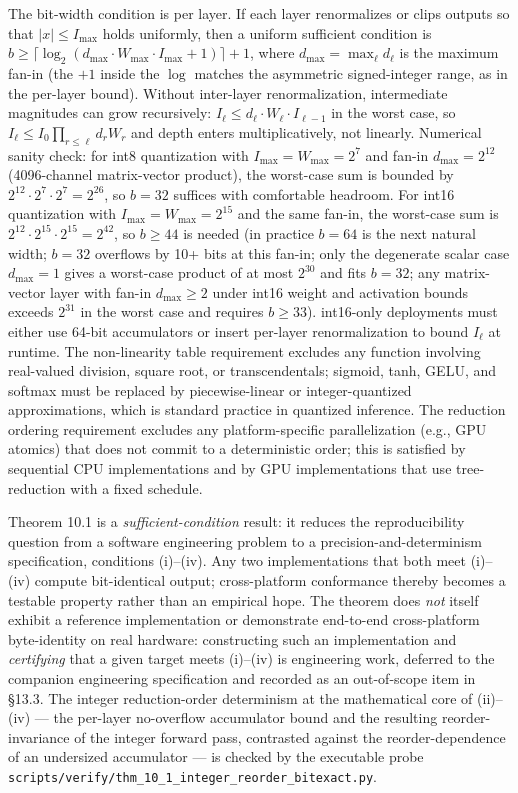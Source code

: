\documentclass[
]{article}
\begin{document}
The bit-width condition is per layer. If each layer renormalizes or
clips outputs so that $|x| \leq I_{\max}$ holds uniformly, then a
uniform sufficient condition is
$b \geq \lceil \log_2(d_{\max} \cdot W_{\max} \cdot I_{\max} + 1) \rceil + 1$,
where $d_{\max} = \max_\ell d_\ell$ is the maximum fan-in (the $+1$
inside the $\log$ matches the asymmetric signed-integer range, as in
the per-layer bound). Without inter-layer renormalization,
intermediate magnitudes can grow recursively:
$I_\ell \leq d_\ell \cdot W_\ell \cdot I_{\ell-1}$ in the worst
case, so $I_\ell \leq I_0 \prod_{r \leq \ell} d_r W_r$ and depth
enters multiplicatively, not linearly. Numerical sanity check: for
int8 quantization with $I_{\max} = W_{\max} = 2^7$ and fan-in
$d_{\max} = 2^{12}$ (4096-channel matrix-vector product), the
worst-case sum is bounded by $2^{12} \cdot 2^7 \cdot 2^7 = 2^{26}$,
so $b = 32$ suffices with comfortable headroom. For int16
quantization with $I_{\max} = W_{\max} = 2^{15}$ and the same
fan-in, the worst-case sum is $2^{12} \cdot 2^{15} \cdot 2^{15} =
2^{42}$, so $b \geq 44$ is needed (in practice $b = 64$ is the next
natural width; $b = 32$ overflows by 10+ bits at this fan-in;
only the degenerate scalar case $d_{\max} = 1$ gives a worst-case
product of at most $2^{30}$ and fits $b = 32$; any matrix-vector
layer with fan-in $d_{\max} \geq 2$ under int16 weight and
activation bounds exceeds $2^{31}$ in the worst case and requires
$b \geq 33$). int16-only deployments must
either use 64-bit accumulators or insert per-layer renormalization
to bound $I_\ell$ at runtime. The non-linearity table requirement
excludes any function involving real-valued division, square root, or
transcendentals; sigmoid, tanh, GELU, and softmax must be replaced by
piecewise-linear or integer-quantized approximations, which is
standard practice in quantized inference. The reduction ordering
requirement excludes any platform-specific parallelization (e.g., GPU
atomics) that does not commit to a deterministic order; this is
satisfied by sequential CPU implementations and by GPU implementations
that use tree-reduction with a fixed schedule.

Theorem 10.1 is a \emph{sufficient-condition} result: it reduces the
reproducibility question from a software engineering problem to a
precision-and-determinism specification, conditions (i)--(iv). Any two
implementations that both meet (i)--(iv) compute bit-identical output;
cross-platform conformance thereby becomes a testable property rather
than an empirical hope. The theorem does \emph{not} itself exhibit a
reference implementation or demonstrate end-to-end cross-platform
byte-identity on real hardware: constructing such an implementation and
\emph{certifying} that a given target meets (i)--(iv) is engineering
work, deferred to the companion engineering specification and recorded
as an out-of-scope item in §13.3. The integer reduction-order
determinism at the mathematical core of (ii)--(iv) --- the per-layer
no-overflow accumulator bound and the resulting reorder-invariance of
the integer forward pass, contrasted against the reorder-dependence of
an undersized accumulator --- is checked by the executable probe
\texttt{scripts/verify/thm\_10\_1\_integer\_reorder\_bitexact.py}.
\end{document}
